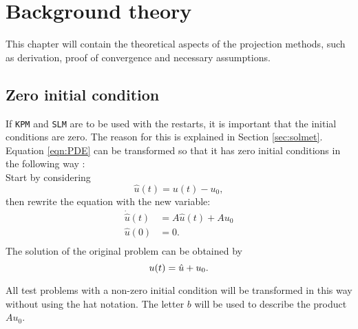 \chapter{Background theory}
This chapter will contain the theoretical aspects of the projection methods, such as derivation, proof of convergence and necessary assumptions. 
 
\section{Zero initial condition}%
\label{sec:inittransf}
If \texttt{KPM} and \texttt{SLM} are to be used with the restarts, it is important that the initial conditions are zero. The reason for this is explained in Section \ref{sec:solmet}. Equation \eqref{eqn:PDE} can be transformed so that it has zero initial conditions in the following way \cite{zerotransf}: \\

\noindent Start by considering
\begin{equation*}
\hat{u}(t) = u(t)-u_0,
\end{equation*}
then rewrite the equation with the new variable:
\begin{equation}
\begin{aligned}
\dot{\hat{u}}(t) &= A \hat{u}(t) +A u_0\\
 \hat{u}(0)&= 0. \\
\end{aligned}
\label{eqn:shiftedproblem}
\end{equation}
\noindent The solution of the original problem can be obtained by
\begin{equation*}
 u(t) = \hat{u} + u_0. \\
\end{equation*}


\noindent All test problems with a non-zero initial condition will be transformed in this way without using the hat notation. The letter $b$ will be used to describe the product $A u_0$.

